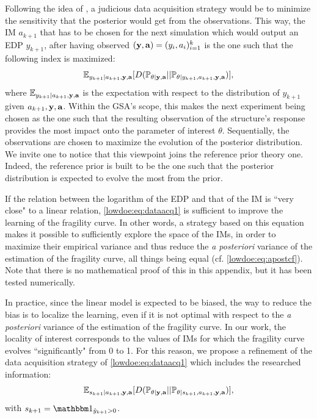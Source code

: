 Following the idea of \citet{da_veiga_global_2015}, a judicious data acquisition strategy would be to minimize the sensitivity that the posterior would get from the observations. This way, the IM $a_{k+1}$ that has to be chosen for the next simulation which would output an EDP $y_{k+1}$, after having observed $(\mathbf{y}, \mathbf{a})=(y_i,a_i)_{i=1}^k$ is the one such that the following index is maximized:
    \begin{equation}\label{lowdoe:eq:dataacq1}
        \mathbb{E}_{y_{k+1}|a_{k+1},\mathbf{y},\mathbf{a}}[D(\mathbb{P}_{\theta|\mathbf{y},\mathbf{a}} || \mathbb{P}_{\theta|y_{k+1},a_{k+1},\mathbf{y},\mathbf{a}} )],
    \end{equation}
where $\mathbb{E}_{y_{k+1}|a_{k+1},\mathbf{y},\mathbf{a}}$ is the expectation with respect to the distribution of $y_{k+1}$ given $a_{k+1},\mathbf{y},\mathbf{a}$.
Within the GSA's scope, this makes the next experiment being chosen as the one such that the resulting observation of the structure's response provides the most impact onto the parameter of interest $\theta$. Sequentially, the observations are chosen to maximize the evolution of the posterior distribution. We invite one to notice that this viewpoint joins the reference prior theory one. Indeed, the reference prior is built to be the one such that the posterior distribution is expected to evolve the most from the prior. %

If the relation between the logarithm of the EDP and that of the IM is ``very close" to a linear relation, \cref{lowdoe:eq:dataacq1} is sufficient to improve the learning of the fragility curve. In other words, a strategy based on this equation makes it possible to sufficiently explore the space of the IMs, in order to maximize their empirical variance and thus reduce the \emph{a posteriori} variance of the estimation of the fragility curve, all things being equal (cf. \cref{lowdoe:eq:apostcf}). Note that there is no mathematical proof of this in this appendix, but it has been tested numerically. 

In practice, since the linear model is expected to be biased, the way to reduce the bias is to localize the learning, even if it is not optimal with respect to the \emph{a posteriori} variance of the estimation of the fragility curve. In our work, the locality of interest corresponds to the values of IMs for which the fragility curve evolves ``significantly" from 0 to 1. For this reason, we propose a refinement of the data acquisition strategy of \cref{lowdoe:eq:dataacq1} which includes the researched information:
    \begin{equation}\label{lowdoe:eq:ALs}
        \mathbb{E}_{ s_{k+1}|a_{k+1},\mathbf{y},\mathbf{a}}[D(\mathbb{P}_{\theta|\mathbf{y},\mathbf{a}} || \mathbb{P}_{\theta|s_{k+1},a_{k+1},\mathbf{y},\mathbf{a}} )],
    \end{equation}
with $s_{k+1}=\indic_{\hat y_{k+1}>0}$.

